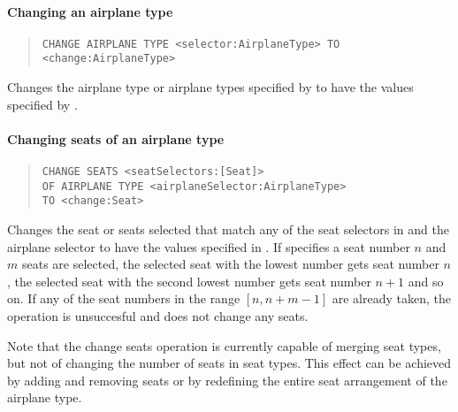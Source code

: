 \paragraph{Changing an airplane type}
\begin{quote}
  \lstinline|CHANGE AIRPLANE TYPE <selector:AirplaneType> TO <change:AirplaneType>|
\end{quote}
Changes the airplane type or airplane types specified by  to have
the values specified by .

\paragraph{Changing seats of an airplane type}
\begin{quote}
  \begin{lstlisting}
CHANGE SEATS <seatSelectors:[Seat]>
OF AIRPLANE TYPE <airplaneSelector:AirplaneType>
TO <change:Seat>
  \end{lstlisting}
\end{quote}
Changes the seat or seats selected that match any of the seat selectors in
 and the airplane selector  to have the
values specified in .
If  specifies a seat number $n$ and $m$ seats are selected,
the selected seat with the lowest number gets seat number $n$, the selected
seat with the second lowest number gets seat number $n+1$ and so on. If any
of the seat numbers in the range $[n,n+m-1]$ are already taken, the
operation is unsuccesful and does not change any seats.

Note that the change seats operation is currently capable of merging seat types,
but not of changing the number of seats in seat types. This effect can be
achieved by adding and removing seats or by redefining the entire seat
arrangement of the airplane type.

